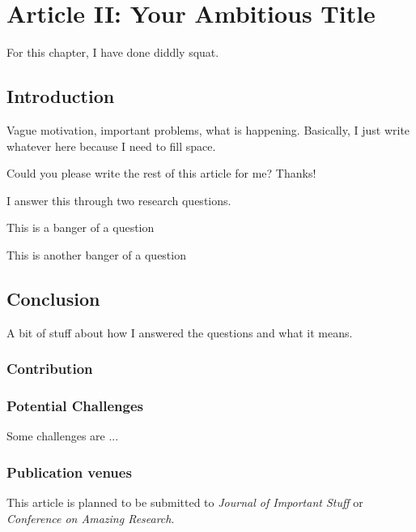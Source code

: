 \chapter{Article II: Your Ambitious Title} \label{sec:article_2_main}
\begin{researchbox}
    For this chapter, I have done diddly squat. 
\end{researchbox}


\section{Introduction} \label{ch2:sec:introduction}
Vague motivation, important problems, what is happening. Basically, I just write whatever here because I need to fill space.

Could you please write the rest of this article for me? Thanks!


I answer this through two research questions.


This is a banger of a question


This is another banger of a question

\section{Conclusion}
A bit of stuff about how I answered the questions and what it means.

\subsection{Contribution}

\subsection{Potential Challenges}
Some challenges are ...


\subsection{Publication venues}
This article is planned to be submitted to \textit{Journal of Important Stuff} or \textit{Conference on Amazing Research}.






